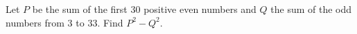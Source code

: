 Let $P$ be the sum of the first $30$ positive even numbers and $Q$ the sum of the odd numbers from $3$ to $33$. Find $P^2-Q^2$.
